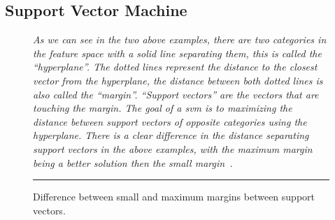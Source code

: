 \subsection{Support Vector Machine}
\label{subsec:background_support_vector_machine}
\begin{figure}[t!]
  \centering
  \qquad
  \caption{Difference between small and maximum margins between support vectors.}
  \vspace{1mm}
  \footnotesize{\emph{As we can see in the two above examples, there are two categories in the feature space with a solid line separating them, this is called the ``hyperplane''. The dotted lines represent the distance to the closest vector from the hyperplane, the distance between both dotted lines is also called the ``margin''. ``Support vectors'' are the vectors that are touching the margin. The goal of a \gls{svm} is to maximizing the distance between support vectors of opposite categories using the hyperplane. There is a clear difference in the distance separating support vectors in the above examples, with the maximum margin~ being a better solution then the small margin~.}}
  \vspace{2mm}
  \hrule
  \label{fig:SVM_margin}
\end{figure}

